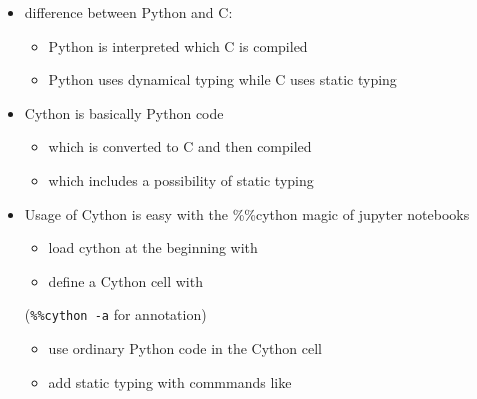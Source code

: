 \documentclass[11pt]{article}
\providecommand{\tightlist}{%
      \setlength{\itemsep}{0pt}\setlength{\parskip}{0pt}}
\newenvironment{Shaded}{}{}
\newcommand{\NormalTok}[1]{{#1}}
\newcommand{\OperatorTok}[1]{\textcolor[rgb]{0.40,0.40,0.40}{{#1}}}
\begin{document}
\begin{itemize}
\tightlist
\item
  difference between Python and C:

  \begin{itemize}
  \tightlist
  \item
    Python is interpreted which C is compiled
  \item
    Python uses dynamical typing while C uses static typing
  \end{itemize}
\item
  Cython is basically Python code

  \begin{itemize}
  \tightlist
  \item
    which is converted to C and then compiled
  \item
    which includes a possibility of static typing
  \end{itemize}
\item
  Usage of Cython is easy with the \%\%cython magic of jupyter notebooks

  \begin{itemize}
  \tightlist
  \item
    load cython at the beginning with
  \end{itemize}

\begin{Shaded}
\begin{Highlighting}[]
\OperatorTok{%}\NormalTok{load_ext cython}
\end{Highlighting}
\end{Shaded}

  \begin{itemize}
  \tightlist
  \item
    define a Cython cell with
  \end{itemize}

\begin{Shaded}
\begin{Highlighting}[]
\OperatorTok{%%}\NormalTok{cython}
\end{Highlighting}
\end{Shaded}

  (\texttt{\%\%cython\ -a} for annotation)

  \begin{itemize}
  \tightlist
  \item
    use ordinary Python code in the Cython cell
  \item
    add static typing with commmands like
  \end{itemize}


\end{itemize}
\end{document}
